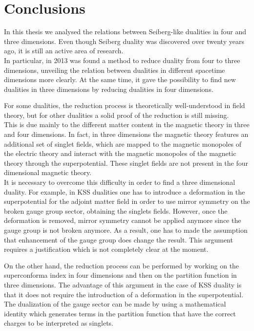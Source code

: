 \chapter*{\bfseries Conclusions}

In this thesis we analysed the relations between Seiberg-like dualities in four and three dimensions. 
Even though Seiberg duality was discovered over twenty years ago, it is still an active area of research.\\
In particular, in 2013 was found a method to reduce duality from four to three dimensions, unveiling the relation between dualities in different spacetime dimensions more clearly.
At the same time, it gave the possibility to find new dualities in three dimensions by reducing dualities in four dimensions.

For some dualities, the reduction process is theoretically well-understood in field theory, but for other dualities a solid proof of the reduction is still missing.\\
This is due mainly to the different matter content in the magnetic theory in three and four dimensions.
In fact, in three dimensions the magnetic theory features an additional set of singlet fields, which are mapped to the magnetic monopoles of the electric theory and interact with the magnetic monopoles of the magnetic theory through the superpotential.
These singlet fields are not present in the four dimensional magnetic theory.
\\
It is necessary to overcome this difficulty in order to find a three dimensional duality.
For example, in KSS dualities one has to introduce a deformation in the superpotential for the adjoint matter field in order to use mirror symmetry on the broken gauge group sector, obtaining the singlets fields. 
However, once the deformation is removed, mirror symmetry cannot be applied anymore since the gauge group is not broken anymore.
As a result, one has to made the assumption that enhancement of the gauge group does change the result.
This argument requires a justification which is not completely clear at the moment.

On the other hand, the reduction process can be performed by working on the superconforma index in four dimensions and then on the partition function in three dimensions.
The advantage of this argument in the case of KSS duality is that it does not require the introduction of a deformation in the superpotential.
The dualization of the gauge sector can be made by using a mathematical identity which generates terms in the partition function that have the correct charges to be interpreted as singlets.\\



